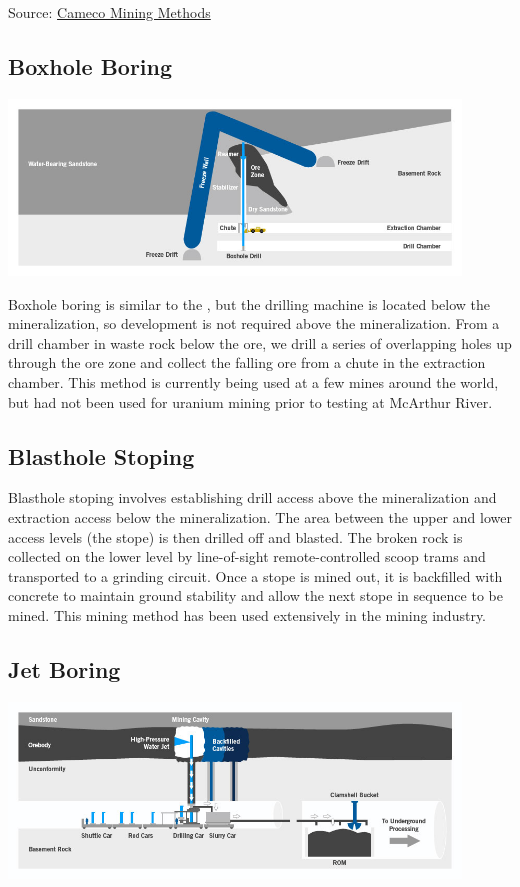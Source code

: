 Source: \href{https://www.cameco.com/businesses/mining-methods}{Cameco Mining Methods}

\subsection*{Boxhole Boring}
\label{ssec:boxbore}
\includegraphics[width=0.9\textwidth]{img/cameco/3.0.1-1MiningMethods-Boxhole.jpg}

Boxhole boring is similar to the , but the drilling machine is located below the mineralization, so development is not required above the mineralization. From a drill chamber in waste rock below the ore, we drill a series of overlapping holes up through the ore zone and collect the falling ore from a chute in the extraction chamber. This method is currently being used at a few mines around the world, but had not been used for uranium mining prior to testing at McArthur River.
\subsection*{Blasthole Stoping}


Blasthole stoping involves establishing drill access above the mineralization and extraction access below the mineralization. The area between the upper and lower access levels (the stope) is then drilled off and blasted. The broken rock is collected on the lower level by line-of-sight remote-controlled scoop trams and transported to a grinding circuit. Once a stope is mined out, it is backfilled with concrete to maintain ground stability and allow the next stope in sequence to be mined. This mining method has been used extensively in the mining industry.
\subsection*{Jet Boring}
\label{ssec:jetbore}
\includegraphics[width=0.9\textwidth]{img/cameco/3.0.1-2MiningMethods-JetBore.jpg}

